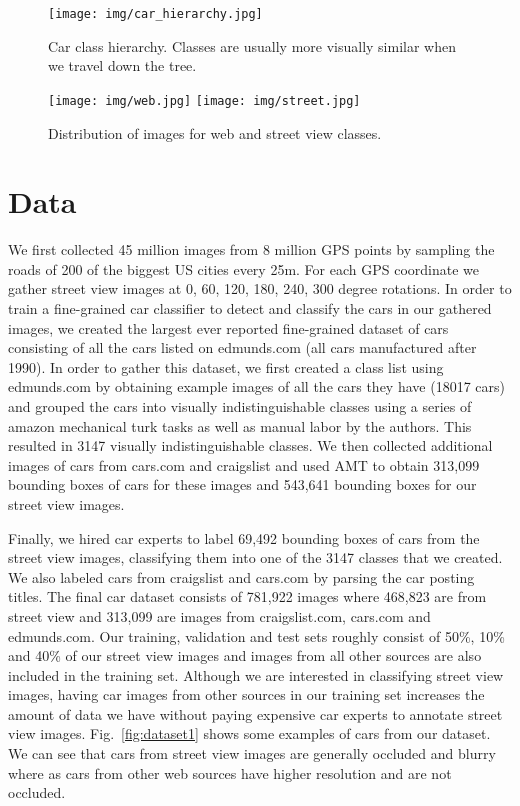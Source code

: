 \documentclass[10pt,twocolumn,letterpaper]{article}
\begin{document}
\begin{figure} [t]
\begin{center}
\texttt{[image: img/car\_hierarchy.jpg]}
\end{center}
\caption {Car class hierarchy. Classes are usually more visually similar when we travel down the tree.}
\label{fig:hierarchy}
\end{figure}

\begin{figure} [t]
\begin{center}
\texttt{[image: img/web.jpg]}
\texttt{[image: img/street.jpg]}
\end{center}
\caption {Distribution of images for web and street view classes.}
\label{fig:img_dist}
\end{figure}

\section{Data}

We first collected 45 million images from 8 million GPS points by sampling the roads of 200 of the biggest US cities every 25m. For each GPS coordinate we gather street view images at 0, 60, 120, 180, 240, 300 degree rotations. In order to train a fine-grained car classifier to detect and classify the cars in our gathered images, we created the largest ever reported fine-grained dataset of cars consisting of all the cars listed on edmunds.com (all cars manufactured after 1990). In order to gather this dataset, we first created a class list using edmunds.com by obtaining example images of all the cars they have (18017 cars) and grouped the cars into visually indistinguishable classes using a series of amazon mechanical turk tasks as well as manual labor by the authors. This resulted in 3147 visually indistinguishable classes. We then collected additional images of cars from cars.com and craigslist and used AMT to obtain 313,099 bounding boxes of cars for these images and 543,641 bounding boxes for our street view images.

Finally, we hired car experts to label 69,492 bounding boxes of cars from the street view images, classifying them into one of the 3147 classes that we created. We also labeled cars from craigslist and cars.com by parsing the car posting titles. The final car dataset consists of 781,922 images where 468,823 are from street view and 313,099 are images from craigslist.com, cars.com and edmunds.com. Our training, validation and test sets roughly consist of 50\%, 10\% and 40\% of our street view images and images from all other sources are also included in the training set. Although we are interested in classifying street view images, having car images from other sources in our training set increases the amount of data we have without paying expensive car experts to annotate street view images. Fig.~\ref{fig:dataset1} shows some examples of cars from our dataset. We can see that cars from street view images are generally occluded and blurry where as cars from other web sources have higher resolution and are not occluded.
\end{document}

